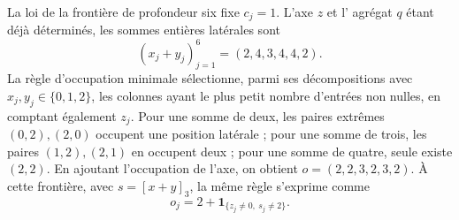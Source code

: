 La loi de la frontière de profondeur six fixe \(c_j=1\). L'axe \(z\) et l'
agrégat \(q\) étant déjà déterminés, les sommes entières latérales sont
\[
 (x_j+y_j)_{j=1}^6=(2,4,3,4,4,2).
\]
La règle d'occupation minimale sélectionne, parmi ses décompositions avec \(x_j,y_j\in\{0,1,2\}\), les colonnes ayant le plus petit nombre d'entrées non nulles, en comptant également \(z_j\). Pour une somme de deux, les paires extrêmes \((0,2),(2,0)\) occupent une position latérale ; pour une somme de trois, les paires \((1,2),(2,1)\) en occupent deux ; pour une somme de quatre, seule existe \((2,2)\). En ajoutant l'occupation de l'axe, on obtient \(o=(2,2,3,2,3,2)\). À cette frontière, avec \(s=[x+y]_3\), la même règle s'exprime comme
\[
 o_j=2+\mathbf1_{\{z_j\ne0,\ s_j\ne2\}}.
\]
